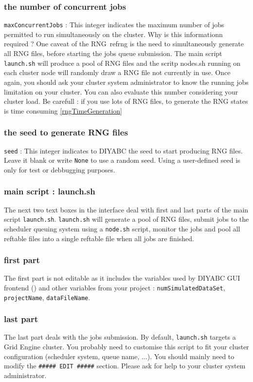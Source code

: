 \subsubsection{the number of concurrent jobs}
\texttt{maxConcurrentJobs} : This integer indicates the maximum number of jobs permitted to run simultaneously on the cluster. Why is this informationn required ? One caveat of the RNG~ref{rng} is the need to simultaneously generate all RNG files, before starting the jobs queue submission. The main script \texttt{launch.sh} will produce a pool of RNG files and the scritp nodes.sh running on each cluster node will randomly draw a RNG file not currently in use. Once again, you should ask your cluster system administrator to know the running jobs limitation on your cluster. You can also evaluate this number considering your cluster load. Be carefull : if you use lots of RNG files, to generate the RNG states is time consuming \ref{rngTimeGeneration}

\subsubsection{the seed to generate RNG files}
\texttt{seed} : This integer indicates to DIYABC the seed to start producing RNG files. Leave it blank or write \texttt{None} to use a random seed. Using a user-defined seed is only for test or debbugging purposes. 

\subsubsection{main script : launch.sh}
The next two text boxes in the interface deal with first and last parts of the main script \texttt{launch.sh}. \texttt{launch.sh} will generate a pool of RNG files, submit jobs to the scheduler queuing system using a \texttt{node.sh} script, monitor the jobs and pool all reftable files into a single reftable file when all jobs are finished.

\subsubsection{first part}
The first part is not editable as it includes the variables used by DIYABC GUI frontend (\label{paramconfig}) and other variables from your project : \texttt{numSimulatedDataSet}, \texttt{projectName}, \texttt{dataFileName}. 

\subsubsection{last part}
The last part deals with the jobs submission. By default, \texttt{launch.sh} targets a Grid Engine cluster. You probably need to customise this script to fit your cluster configuration (scheduler system, queue name, ...). You should mainly need to modify the  \texttt{\#\#\#\#\# EDIT \#\#\#\#\#} section. Please ask for help to your cluster system administrator.


